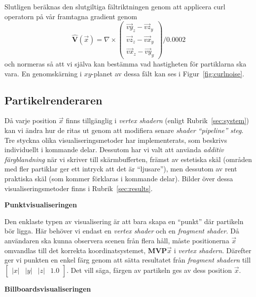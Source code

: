 \documentclass[a4paper]{article}
\begin{document}
\begin{multicols}{2}
Slutligen beräknas den slutgiltiga fältriktningen genom att applicera curl operatorn på vår framtagna gradient genom
\begin{equation}
\mathbf{\hat{V}}(\vec{x}) =
\nabla \times \begin{pmatrix}
\vec{vy}_z - \vec{vz}_y
\\ 
\vec{vz}_z - \vec{vx}_y
\\ 
\vec{vx}_z - \vec{vy}_y
\end{pmatrix} / 0.0002
\end{equation}
och normeras så att vi själva kan bestämma vad hastigheten för partiklarna ska vara. En genomskärning i $xy$-planet av dessa fält kan ses i Figur~\ref{fig:curlnoise}.

\subsection{Partikelrenderaren} \label{sec:partikelrenderaren}

Då varje position \(\vec{x}\) finns tillgänglig i \emph{vertex shadern} (enligt Rubrik~\ref{sec:system}) kan vi ändra hur de ritas ut genom att modifiera senare \emph{shader ``pipeline'' steg}. Tre styckna olika visualiseringsmetoder har implementerats, som beskrivs individuellt i kommande delar. Dessutom har vi valt att använda \emph{additiv färgblandning} när vi skriver till skärmbufferten, främst av estetiska skäl (områden med fler partiklar ger ett intryck att det är ``ljusare''), men dessutom av rent praktiska skäl (som kommer förklaras i kommande delar). Bilder över dessa visualiseringsmetoder finns i Rubrik~\ref{sec:results}.

\textbf{Punktvisualiseringen}

Den enklaste typen av visualisering är att bara skapa en ``punkt'' där partikeln bör ligga. Här behöver vi endast en \emph{vertex shader} och en \emph{fragment shader}. Då användaren ska kunna observera scenen från flera håll, måste positionerna \(\vec{x}\) omvandlas till det korrekta koordinatsystemet, \(\mathbf{MVP}\vec{x}\) i \emph{vertex shadern}. Därefter ger vi punkten en enkel färg genom att sätta resultatet från \emph{fragment shadern} till \(\begin{bmatrix}|x| & |y| & |z| & 1.0\end{bmatrix}\). Det vill säga, färgen av partikeln ges av dess position \(\vec{x}\).

\textbf{Billboardsvisualiseringen}


\end{multicols}
\end{document}
